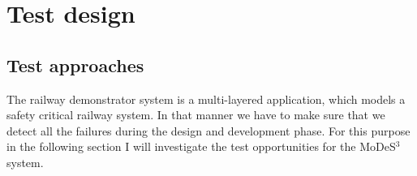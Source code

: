 \chapter{Test design}
\section{Test approaches}
The railway demonstrator system is a multi-layered application, which models a safety critical railway system. In that manner we have to make sure that we detect all the failures during the design and development phase. For this purpose in the following section I will investigate the test opportunities for the MoDeS$^3$ system.

